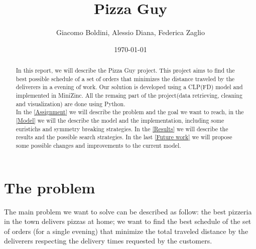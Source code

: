 \documentclass[10pt]{article}
\title{Pizza Guy}
\date{\today}
\author{Giacomo Boldini, Alessio Diana, Federica Zaglio}
\begin{document}
	\maketitle

	\begin{abstract}

		In this report, we will describe the Pizza Guy project. This project 
		aims to find the best possible schedule of a set of orders that
		minimizes the distance traveled by the deliverers in a evening of 
		work. Our solution is developed using a CLP(FD) model and implemented 
		in MiniZinc. All the remaing part of the project(data retrieving, cleaning
		and visualization) are done using Python.\\	
		In the \cref{Assignment} we will describe the problem and the goal
		we want to reach, in the \cref{Model} we will the describe the 
		model and the implementation, including some euristichs and symmetry breaking
		strategies. In the \cref{Results} we will describe the results and
		the possible search strategies. In the last \cref{Future work} we 
		will propose some possible changes and improvements to the current model.
		
	\end{abstract}

	\tableofcontents

	\pagebreak

	\section{The problem}
	\label{Assignment}
	The main problem we want to solve can be described as follow: the best pizzeria in the 
	town delivers pizzas at home; we want to find the best schedule of the set of orders 
	(for a single evening) that minimize the total traveled distance by the deliverers 
	respecting the delivery times requested by the customers.
	
\end{document}

